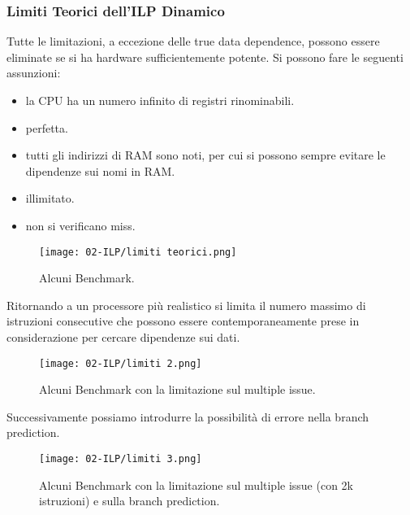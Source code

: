\subsubsection{Limiti Teorici dell'ILP Dinamico}

Tutte le limitazioni, a eccezione delle true data dependence, possono essere eliminate se si ha hardware sufficientemente potente. Si possono fare le seguenti assunzioni: 

\begin{itemize}
  \item {} la CPU ha un numero infinito di registri rinominabili. 
  \item {} perfetta. 
  \item {} tutti gli indirizzi di RAM sono noti, per cui si possono sempre evitare le dipendenze sui nomi in RAM.
\item {} illimitato. 
\item {} non si verificano miss.
\end{itemize}

\begin{figure}[!h]
    \centering
    \texttt{[image: 02-ILP/limiti teorici.png]}
    \caption{Alcuni Benchmark.}
\end{figure}

Ritornando a un processore più realistico si limita il numero massimo di istruzioni consecutive che possono essere contemporaneamente prese in considerazione per cercare dipendenze sui dati.

\begin{figure}[!h]
    \centering
    \texttt{[image: 02-ILP/limiti 2.png]}
    \caption{Alcuni Benchmark con la limitazione sul multiple issue.}
\end{figure}

Successivamente possiamo introdurre la possibilità di errore nella branch prediction. 

\begin{figure}[!h]
    \centering
    \texttt{[image: 02-ILP/limiti 3.png]}
    \caption{Alcuni Benchmark con la limitazione sul multiple issue (con 2k istruzioni) e sulla branch prediction.}
\end{figure}


